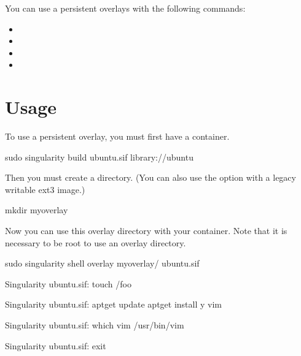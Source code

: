\documentclass[letterpaper,10pt,english]{sphinxmanual}
\begin{document}
You can use a persistent overlays with the following commands:
\begin{itemize}
\item {} 

\item {} 

\item {} 

\item {} 

\end{itemize}


\section{Usage}
\label{\detokenize{persistent_overlays:usage}}
To use a persistent overlay, you must first have a container.

%
\begin{sphinxVerbatim}[commandchars=\\\{\}]
\PYGZdl{} sudo singularity build ubuntu.sif library://ubuntu
\end{sphinxVerbatim}

Then you must create a directory. (You can also use the  option
with a legacy writable ext3 image.)

%
\begin{sphinxVerbatim}[commandchars=\\\{\}]
\PYGZdl{} mkdir my\PYGZus{}overlay
\end{sphinxVerbatim}

Now you can use this overlay directory with your container. Note that it is
necessary to be root to use an overlay directory.

%
\begin{sphinxVerbatim}[commandchars=\\\{\}]
\PYGZdl{} sudo singularity shell \PYGZhy{}\PYGZhy{}overlay my\PYGZus{}overlay/ ubuntu.sif

Singularity ubuntu.sif:\PYGZti{}\PYGZgt{} touch /foo

Singularity ubuntu.sif:\PYGZti{}\PYGZgt{} apt\PYGZhy{}get update \PYGZam{}\PYGZam{} apt\PYGZhy{}get install \PYGZhy{}y vim

Singularity ubuntu.sif:\PYGZti{}\PYGZgt{} which vim
/usr/bin/vim

Singularity ubuntu.sif:\PYGZti{}\PYGZgt{} exit
\end{sphinxVerbatim}
\end{document}
